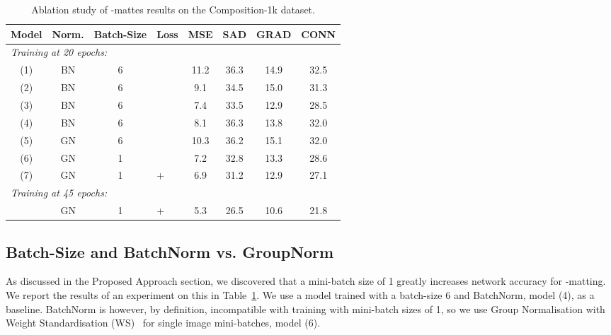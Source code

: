 \documentclass[runningheads]{llncs}
\begin{document}
\begin{table}[t]
\centering
\caption{Ablation study of -mattes results on the Composition-1k dataset.} 
\label{tab:comp1k_alpha_ablation}
\begin{tabular}{ccclcccc}
  \toprule
Model & Norm. & Batch-Size & Loss          & MSE & SAD & GRAD & CONN \\ 
\midrule
    \multicolumn{8}{l}{\textit{Training at 20 epochs:} \vspace{.3em}} \\
  (1) & BN            & 6         &             &  11.2   & 36.3     & 14.9    & 32.5 \\
(2) & BN            & 6         &         & 9.1    &    34.5 &   15.0    & 31.3 \\
(3) & BN            & 6         &      & 7.4    & 33.5    & 12.9 & 28.5    \\
(4) & BN            & 6         &  & 8.1    & 36.3     &    13.8  & 32.0 \\
(5) & GN            & 6         &  & 10.3    & 36.2 & 15.1     &  32.0 \\

(6) & GN            & 1         &  & 7.2    & 32.8 &    13.3  & 28.6 \\
(7) & GN            & 1         & +  & 6.9      &  31.2   & 12.9 & 27.1 \\
\midrule
    \multicolumn{8}{l}{\textit{Training at 45 epochs:} \vspace{.3em}} \\
  \textbf{} &GN            & 1         & +  & 5.3      &  26.5   & 10.6 & 21.8 \\
\bottomrule
\end{tabular}
\end{table}



\subsection{Batch-Size and BatchNorm vs. GroupNorm}

As discussed in the Proposed Approach section, we discovered that a mini-batch size of 1 greatly increases network accuracy for -matting. We report the results of an experiment on this in Table~\ref{tab:comp1k_alpha_ablation}. We use a model trained with a batch-size 6 and BatchNorm, model (4), as a baseline. BatchNorm is however, by definition, incompatible with training with mini-batch sizes of 1, so we use Group Normalisation with Weight Standardisation (WS)~\cite{groupnorm,weightstandardization} for single image mini-batches, model (6).
\end{document}
